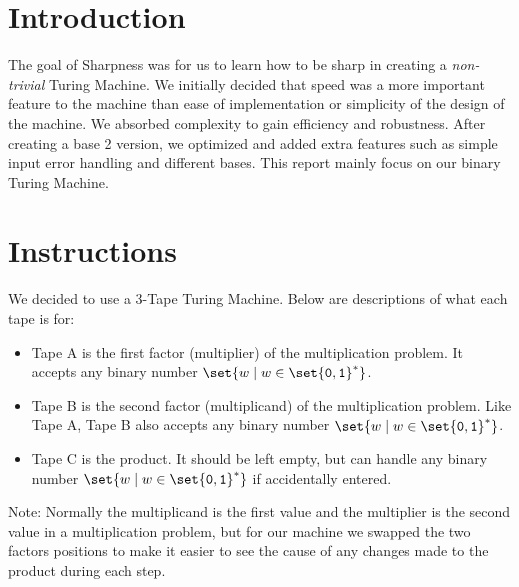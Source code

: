 \documentclass{article}
\begin{document}


\section*{Introduction}
The goal of Sharpness was for us to learn how to be sharp in creating a {\em non-trivial} Turing Machine. We initially decided that speed was a more important feature to the machine than ease of implementation or simplicity of the design of the machine. We absorbed complexity to gain efficiency and robustness. After creating a base 2 version, we optimized and added extra features such as simple input error handling and different bases. This report mainly focus on our binary Turing Machine.


\section*{Instructions}
We decided to use a 3-Tape Turing Machine. Below are descriptions of what each tape is for:
\begin{itemize}
	\item Tape A is the first factor (multiplier) of the multiplication problem. It accepts any binary number $\set{w \mid w \in \set{\mathtt{0},\mathtt{1}}^*}$.
	\item Tape B is the second factor (multiplicand) of the multiplication problem. Like Tape A, Tape B also accepts any binary number $\set{w \mid w \in \set{\mathtt{0},\mathtt{1}}^*}$.
	\item Tape C is the product. It should be left empty, but can handle any binary number $\set{w \mid w \in \set{\mathtt{0},\mathtt{1}}^*}$ if accidentally entered.
\end{itemize}
{\footnotesize Note: Normally the multiplicand is the first value and the multiplier is the second value in a multiplication problem, but for our machine we swapped the two factors positions to make it easier to see the cause of any changes made to the product during each step.}
\end{document}
